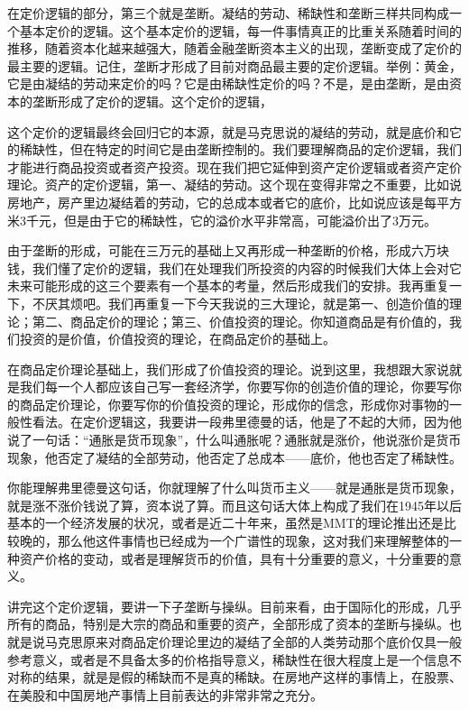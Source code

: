 \documentclass[UTF8, 12pt, a4paper]{ctexrep}
\begin{document}
在定价逻辑的部分，第三个就是垄断。凝结的劳动、稀缺性和垄断三样共同构成一个基本定价的逻辑。这个基本定价的逻辑，每一件事情真正的比重关系随着时间的推移，随着资本化越来越强大，随着金融垄断资本主义的出现，垄断变成了定价的最主要的逻辑。记住，垄断才形成了目前对商品最主要的定价逻辑。举例：黄金，它是由凝结的劳动来定价的吗？它是由稀缺性定价的吗？不是，是由垄断，是由资本的垄断形成了定价的逻辑。这个定价的逻辑，

这个定价的逻辑最终会回归它的本源，就是马克思说的凝结的劳动，就是底价和它的稀缺性，但在特定的时间它是由垄断控制的。我们要理解商品的定价逻辑，我们才能进行商品投资或者资产投资。现在我们把它延伸到资产定价逻辑或者资产定价理论。资产的定价逻辑，第一、凝结的劳动。这个现在变得非常之不重要，比如说房地产，房产里边凝结着的劳动，它的总成本或者它的底价，比如说应该是每平方米3千元，但是由于它的稀缺性，它的溢价水平非常高，可能溢价出了3万元。

由于垄断的形成，可能在三万元的基础上又再形成一种垄断的价格，形成六万块钱，我们懂了定价的逻辑，我们在处理我们所投资的内容的时候我们大体上会对它未来可能形成的这三个要素有一个基本的考量，然后形成我们的安排。我再重复一下，不厌其烦吧。我们再重复一下今天我说的三大理论，就是第一、创造价值的理论；第二、商品定价的理论；第三、价值投资的理论。你知道商品是有价值的，我们投资的是价值，价值投资的理论，在商品定价的基础上。

在商品定价理论基础上，我们形成了价值投资的理论。说到这里，我想跟大家说就是我们每一个人都应该自己写一套经济学，你要写你的创造价值的理论，你要写你的商品定价理论，你要写你的价值投资的理论，形成你的信念，形成你对事物的一般性看法。在定价逻辑这，我要讲一段弗里德曼的话，他是了不起的大师，因为他说了一句话：“通胀是货币现象”，什么叫通胀呢？通胀就是涨价，他说涨价是货币现象，他否定了凝结的全部劳动，他否定了总成本——底价，他也否定了稀缺性。

你能理解弗里德曼这句话，你就理解了什么叫货币主义——就是通胀是货币现象，就是涨不涨价钱说了算，资本说了算。而且这句话大体上构成了我们在1945年以后基本的一个经济发展的状况，或者是近二十年来，虽然是MMT的理论推出还是比较晚的，那么他这件事情也已经成为一个广谱性的现象，这对我们来理解整体的一种资产价格的变动，或者是理解货币的价值，具有十分重要的意义，十分重要的意义。

讲完这个定价逻辑，要讲一下子垄断与操纵。目前来看，由于国际化的形成，几乎所有的商品，特别是大宗的商品和重要的资产，全部形成了资本的垄断与操纵。也就是说马克思原来对商品定价理论里边的凝结了全部的人类劳动那个底价仅具一般参考意义，或者是不具备太多的价格指导意义，稀缺性在很大程度上是一个信息不对称的结果，就是是假的稀缺而不是真的稀缺。在房地产这样的事情上，在股票、在美股和中国房地产事情上目前表达的非常非常之充分。
\end{document}
